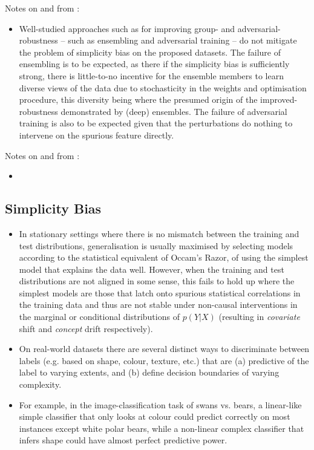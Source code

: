 Notes on and from \cite{shah2020pitfalls}:
\begin{itemize}
        \item Well-studied approaches such as for improving group- and adversarial-robustness --
          such as ensembling and adversarial training -- do not mitigate the problem of simplicity
          bias on the proposed datasets.
          The failure of ensembling is to be expected, as there if the simplicity bias is
          sufficiently strong, there is little-to-no incentive for the ensemble members to learn
          diverse views of the data \citep{allen2020towards} due to stochasticity in the weights
          and optimisation procedure, this diversity being where the presumed origin of the
          improved-robustness demonstrated by (deep) ensembles.
          The failure of adversarial training is also to be expected given that the perturbations
          do nothing to intervene on the spurious feature directly.
\end{itemize}

Notes on and from \cite{geirhos2020shortcut}:
\begin{itemize}
  \item
\end{itemize}

\subsection{Simplicity Bias \citep{valle2018deep, shah2020pitfalls}}
\begin{itemize}
  \item In stationary settings where there is no mismatch between the training and test 
    distributions, generalisation is usually maximised by selecting models according to the 
    statistical equivalent of Occam's Razor, of using the simplest model that explains the data 
    well. However, when the training and test distributions are not aligned in some sense, this 
    fails to hold up where the simplest models are those that latch onto spurious statistical 
    correlations in the training data and thus are not stable under non-causal interventions in 
    the marginal or conditional distributions of $p(Y|X)$ (resulting in \emph{covariate} shift 
    and \emph{concept} drift respectively).
  \item On real-world datasets there are several distinct ways to discriminate between labels (e.g. 
    based on shape, colour, texture, etc.) that are (a) predictive of the label to varying extents, 
    and (b) define decision boundaries of varying complexity. 
  \item For example, in the image-classification task of swans vs. bears, a linear-like simple 
    classifier that only looks at colour could predict correctly on most instances except white 
    polar bears, while a non-linear complex classifier that infers shape could have almost perfect 
    predictive power.
\end{itemize}


